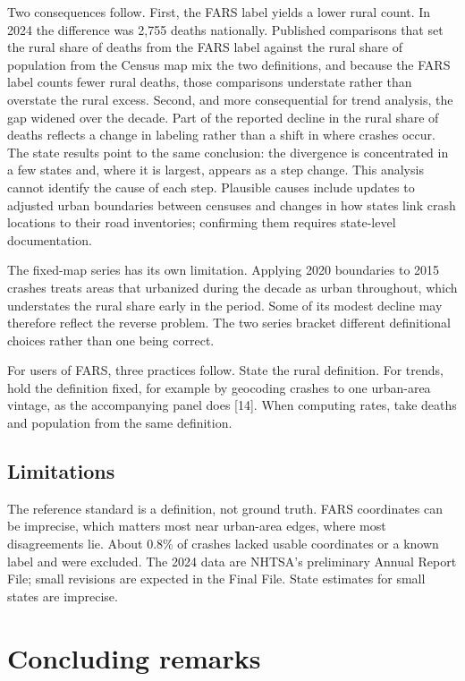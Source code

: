 \documentclass{article}
\begin{document}
Two consequences follow. First, the FARS label yields a lower rural count. In 2024 the difference was 2{,}755 deaths nationally. Published comparisons that set the rural share of deaths from the FARS label against the rural share of population from the Census map mix the two definitions, and because the FARS label counts fewer rural deaths, those comparisons understate rather than overstate the rural excess. Second, and more consequential for trend analysis, the gap widened over the decade. Part of the reported decline in the rural share of deaths reflects a change in labeling rather than a shift in where crashes occur. The state results point to the same conclusion: the divergence is concentrated in a few states and, where it is largest, appears as a step change. This analysis cannot identify the cause of each step. Plausible causes include updates to adjusted urban boundaries between censuses and changes in how states link crash locations to their road inventories; confirming them requires state-level documentation.

The fixed-map series has its own limitation. Applying 2020 boundaries to 2015 crashes treats areas that urbanized during the decade as urban throughout, which understates the rural share early in the period. Some of its modest decline may therefore reflect the reverse problem. The two series bracket different definitional choices rather than one being correct.

For users of FARS, three practices follow. State the rural definition. For trends, hold the definition fixed, for example by geocoding crashes to one urban-area vintage, as the accompanying panel does [14]. When computing rates, take deaths and population from the same definition.

\subsection{Limitations}

The reference standard is a definition, not ground truth. FARS coordinates can be imprecise, which matters most near urban-area edges, where most disagreements lie. About 0.8\% of crashes lacked usable coordinates or a known label and were excluded. The 2024 data are NHTSA's preliminary Annual Report File; small revisions are expected in the Final File. State estimates for small states are imprecise.

\section{Concluding remarks}
\end{document}
